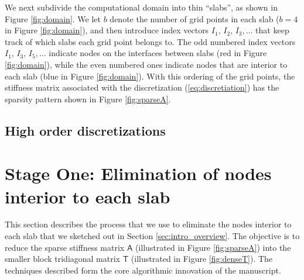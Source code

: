 \documentclass[10pt,a4paper]{amsart}
\newcommand{\mtx}[1]{\bm{\mathsf{#1}}}
\begin{document}
We next subdivide the computational domain into thin ``slabs'', as shown in 
Figure \ref{fig:domain}. We let $b$ denote the number of grid points in each
slab ($b=4$ in Figure \ref{fig:domain}), and then introduce index vectors $I_{1},\, I_{2},\, I_{3}, \dots$ that keep
track of which slabs each grid point belongs to. The odd numbered index
vectors $I_{1},\, I_{3},\,I_{5},\dots$ indicate nodes on the interfaces between
slabs (red in Figure \ref{fig:domain}), while the even numbered ones indicate
nodes that are interior to each slab (blue in Figure \ref{fig:domain}). 
With this ordering of the grid points, the stiffness matrix associated with the
discretization (\ref{eq:discretiation}) has the sparsity pattern shown in 
Figure \ref{fig:sparseA}.


\subsection{High order discretizations}
\label{sec:other_disc}

\section{Stage One: Elimination of nodes interior to each slab}
\label{sec:stageone}

This section describes the process that we use to eliminate 
the nodes interior to each slab that we sketched out in Section \ref{sec:intro_overview}.
The objective is to reduce the sparse stiffness matrix $\mtx{A}$ 
(illustrated in Figure \ref{fig:sparseA}) into the smaller block
tridiagonal matrix $\mtx{T}$ (illustrated in Figure \ref{fig:denseT}).
The techniques described form the core algorithmic innovation
of the manuscript.
\end{document}

